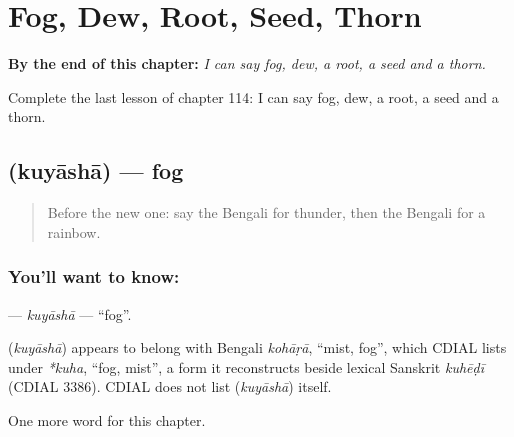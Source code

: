
\chapter{Fog, Dew, Root, Seed, Thorn}
\label{ch:bn-fog-dew-root-seed-thorn}

\begin{chapteropening}
\textbf{By the end of this chapter:} \emph{I can say fog, dew, a root, a seed and a thorn.}

Complete the last lesson of chapter 114: I can say fog, dew, a root, a seed and a thorn.
\end{chapteropening}

\section[\texorpdfstring{\bn{কুয়াশা} (kuyāshā)}{কুয়াশা (kuyāshā)}]{ (kuyāshā) — fog}

\label{lesson:BN-C114-kuyasha}



\begin{quote}
Before the new one: say the Bengali for thunder, then the Bengali for a rainbow.
\end{quote}

\subsection*{You'll want to know: }
\textbf{} — \emph{kuyāshā} — \textquotedblleft{}fog\textquotedblright{}.

\begin{cousinweb}
\textbf{} (\emph{kuyāshā}) appears to belong with Bengali \emph{kohāṛā}, \textquotedblleft{}mist, fog\textquotedblright{}, which CDIAL lists under \emph{*kuha}, \textquotedblleft{}fog, mist\textquotedblright{}, a form it reconstructs beside lexical Sanskrit \emph{kuhēḍī} (CDIAL 3386). CDIAL does not list \textbf{} (\emph{kuyāshā}) itself.
\end{cousinweb}

\begin{grammarlens}[title={What you've built}]
One more word for this chapter.
\end{grammarlens}

